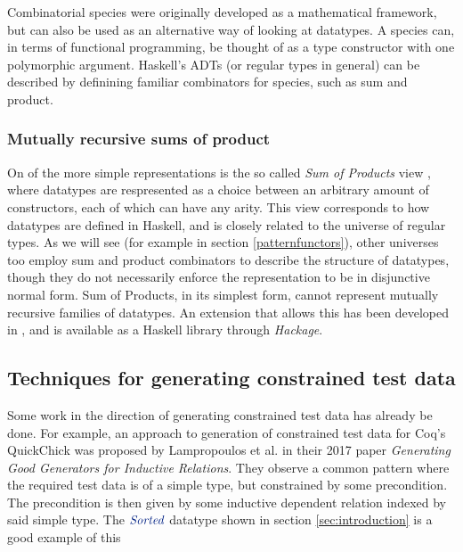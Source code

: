 \documentclass[a4paper,msc,twosized=semi]{uustthesis}
\newcommand*{\mathcolor}{}
\def\mathcolor#1#{\mathcoloraux{#1}}
\newcommand*{\mathcoloraux}[3]{%
  \protect\leavevmode
  \begingroup
    \color#1{#2}#3%
  \endgroup
}
\newcommand{\HSCon}[1]{\mathcolor{hsblue3}{\mathit{#1}}}
\begin{document}
  Combinatorial species \cite{yorgey2010species} were 
  originally developed as a mathematical framework, but can also be used as an 
  alternative way of looking at datatypes. A species can, in terms of functional 
  programming, be thought of as a type constructor with one polymorphic argument. 
  Haskell’s ADTs (or regular types in general) can be described by definining familiar 
  combinators for species, such as sum and product.

\subsubsection{Mutually recursive sums of product}

  On of the more simple representations is the so called \textit{Sum of Products} view 
  \cite{de2014true}, where datatypes are respresented as a choice between an arbitrary 
  amount of constructors, each of which can have any arity. This view corresponds to 
  how datatypes are defined in Haskell, and is closely related to the universe of 
  regular types. As we will see (for example in section \ref{patternfunctors}), other 
  universes too employ sum and product combinators to describe the structure of 
  datatypes, though they do not necessarily enforce the representation to be in 
  disjunctive normal form. Sum of Products, in its simplest form, cannot represent 
  mutually recursive families of datatypes. An extension that allows this has been 
  developed in \cite{miraldo2018sums}, and is available as a Haskell library through 
  \emph{Hackage}.  

\subsection{Techniques for generating constrained test data}

  Some work in the direction of generating constrained test data has already be done. 
  For example, an approach to generation of constrained test data for Coq's QuickChick 
  was proposed by Lampropoulos et al. \cite{lampropoulos2017generating} in their 2017 
  paper \textit{Generating Good Generators for Inductive Relations}. They observe a 
  common pattern where the required test data is of a simple type, but constrained by 
  some precondition. The precondition is then given by some inductive dependent 
  relation indexed by said simple type. The \ensuremath{\HSCon{Sorted}} datatype shown in section \ref{sec:introduction} is a good example of this
\end{document}
